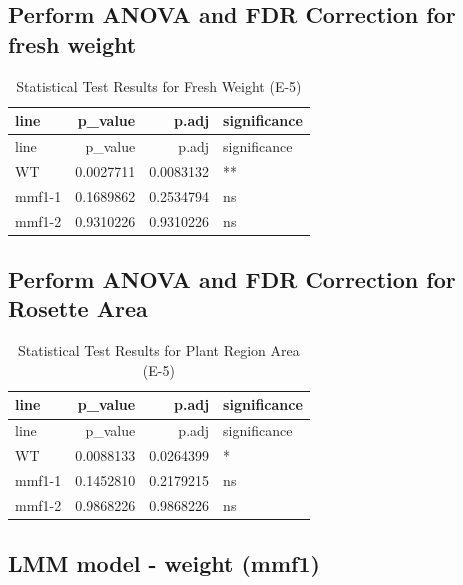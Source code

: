 \documentclass[
  10pt,
]{article}
\begin{document}
\subsection{Perform ANOVA and FDR Correction for fresh
weight}\label{perform-anova-and-fdr-correction-for-fresh-weight-2}

\begin{longtable}[]{@{}lrrl@{}}
\caption{Statistical Test Results for Fresh Weight (E-5)}\tabularnewline
\toprule\noalign{}
line & p\_value & p.adj & significance \\
\midrule\noalign{}
\endfirsthead
\toprule\noalign{}
line & p\_value & p.adj & significance \\
\midrule\noalign{}
\endhead
\bottomrule\noalign{}
\endlastfoot
WT & 0.0027711 & 0.0083132 & ** \\
mmf1-1 & 0.1689862 & 0.2534794 & ns \\
mmf1-2 & 0.9310226 & 0.9310226 & ns \\
\end{longtable}

\subsection{Perform ANOVA and FDR Correction for Rosette
Area}\label{perform-anova-and-fdr-correction-for-rosette-area-2}

\begin{longtable}[]{@{}lrrl@{}}
\caption{Statistical Test Results for Plant Region Area
(E-5)}\tabularnewline
\toprule\noalign{}
line & p\_value & p.adj & significance \\
\midrule\noalign{}
\endfirsthead
\toprule\noalign{}
line & p\_value & p.adj & significance \\
\midrule\noalign{}
\endhead
\bottomrule\noalign{}
\endlastfoot
WT & 0.0088133 & 0.0264399 & * \\
mmf1-1 & 0.1452810 & 0.2179215 & ns \\
mmf1-2 & 0.9868226 & 0.9868226 & ns \\
\end{longtable}

\newpage

\subsection{LMM model - weight (mmf1)}\label{lmm-model---weight-mmf1}
\end{document}

